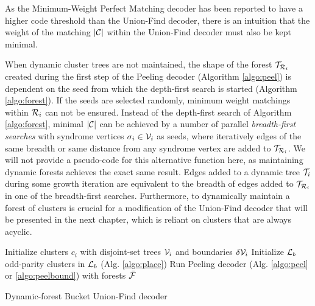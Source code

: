 \begin{proposition}\label{prop:mw1}
  As the Minimum-Weight Perfect Matching decoder has been reported to have a higher code threshold than the Union-Find decoder, there is an intuition that the weight of the matching $|\mathcal{C}|$ within the Union-Find decoder must also be kept minimal. 
\end{proposition}
When dynamic cluster trees are not maintained, the shape of the forest $\mathcal{T}_{\mathcal{R}_i}$ created during the first step of the Peeling decoder (Algorithm \ref{algo:peel}) is dependent on the seed from which the depth-first search is started (Algorithm \ref{algo:forest}).  If the seeds are selected randomly, minimum weight matchings within $\mathcal{R}_i$ can not be ensured. Instead of the depth-first search of Algorithm \ref{algo:forest}, minimal $|\mathcal{C}|$ can be achieved by a number of parallel \emph{breadth-first searches} with syndrome vertices $\sigma_i \in \mathcal{V}_i$ as seeds, where iteratively edges of the same breadth or same distance from any syndrome vertex are added to $\mathcal{T}_{\mathcal{R}_i}$. We will not provide a pseudo-code for this alternative  function here, as maintaining dynamic forests achieves the exact same result. Edges added to a dynamic tree $\mathcal{T}_i$ during some growth iteration are equivalent to the breadth of edges added to $\mathcal{T}_{\mathcal{R}_i}$ in one of the breadth-first searches. Furthermore, to dynamically maintain a forest of clusters is crucial for a modification of the Union-Find decoder that will be presented in the next chapter, which is reliant on clusters that are always acyclic. 

\begin{algorithm}[htb]
  \BlankLine
  \BlankLine
  Initialize clusters $c_i$ with disjoint-set trees $\mathcal{V}_i$ and boundaries $\delta \mathcal{V}_i$\;
  Initialize $\mathcal{L}_b$
   odd-parity clusters in $\mathcal{L}_b$ (Alg. \ref{algo:place})\;
  \BlankLine
  Run Peeling decoder (Alg. \ref{algo:peel} or \ref{algo:peelbound}) with forests $\bar{\mathcal{F}}$
  \BlankLine
  \caption{Dynamic-forest Bucket Union-Find decoder}\label{algo:dbuf}
\end{algorithm}

